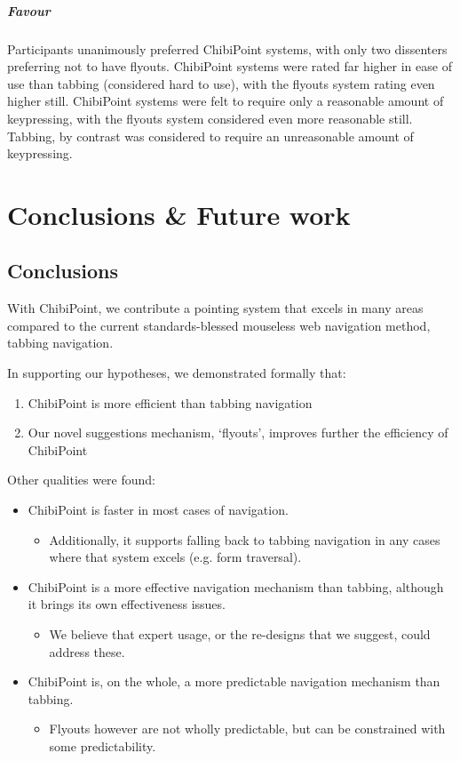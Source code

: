 \documentclass[11pt,openright,a4paper]{report}
\begin{document}
\paragraph{Favour}
Participants unanimously preferred ChibiPoint systems, with only two dissenters preferring not to have flyouts. ChibiPoint systems were rated far higher in ease of use than tabbing (considered hard to use), with the flyouts system rating even higher still. ChibiPoint systems were felt to require only a reasonable amount of keypressing, with the flyouts system considered even more reasonable still. Tabbing, by contrast was considered to require an unreasonable amount of keypressing.

\chapter{Conclusions \& Future work}
\label{chap:conclusions}
\section{Conclusions}
With ChibiPoint, we contribute a pointing system that excels in many areas compared to the current standards-blessed mouseless web navigation method, tabbing navigation.

In supporting our hypotheses, we demonstrated formally that:
\begin{enumerate}
	\item ChibiPoint is more efficient than tabbing navigation
	\item Our novel suggestions mechanism, `flyouts', improves further the efficiency of ChibiPoint
\end{enumerate}

Other qualities were found:

\begin{itemize}
\item ChibiPoint is faster in most cases of navigation.
	\begin{itemize}
	\item Additionally, it supports falling back to tabbing navigation in any cases where that system excels (e.g. form traversal).
	\end{itemize}
\item ChibiPoint is a more effective navigation mechanism than tabbing, although it brings its own effectiveness issues.
	\begin{itemize}
	\item We believe that expert usage, or the re-designs that we suggest, could address these.
	\end{itemize}
\item ChibiPoint is, on the whole, a more predictable navigation mechanism than tabbing.
	\begin{itemize}
	\item Flyouts however are not wholly predictable, but can be constrained with some predictability.
	\end{itemize}
\end{itemize}
\end{document}
